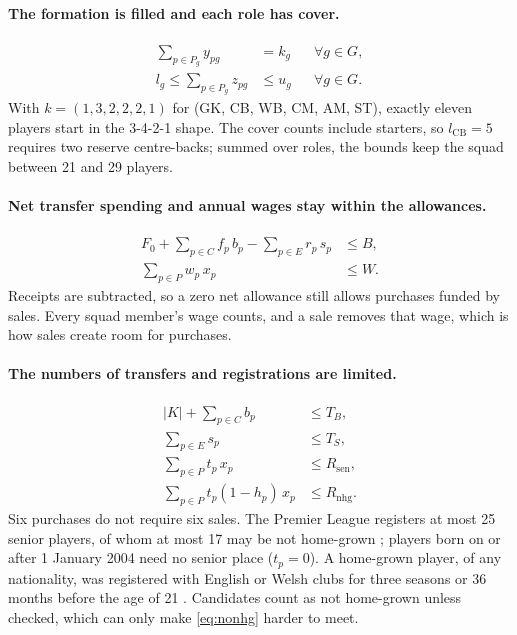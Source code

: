 \paragraph{The formation is filled and each role has cover.}
\begin{align}
\sum_{p \in P_g} y_{pg} &= k_g && \forall g \in G, \label{eq:formation}\\
l_g \le \sum_{p \in P_g} z_{pg} &\le u_g && \forall g \in G. \label{eq:cover}
\end{align}
With $k = (1, 3, 2, 2, 2, 1)$ for (GK, CB, WB, CM, AM, ST), exactly eleven players start in the 3-4-2-1 shape. The cover counts include starters, so $l_{\mathrm{CB}} = 5$ requires two reserve centre-backs; summed over roles, the bounds keep the squad between 21 and 29 players.

\paragraph{Net transfer spending and annual wages stay within the allowances.}
\begin{align}
F_0 + \sum_{p \in C} f_p\, b_p - \sum_{p \in E} r_p\, s_p &\le B, \label{eq:budget}\\
\sum_{p \in P} w_p\, x_p &\le W. \label{eq:wages}
\end{align}
Receipts are subtracted, so a zero net allowance still allows purchases funded by sales. Every squad member's wage counts, and a sale removes that wage, which is how sales create room for purchases.

\paragraph{The numbers of transfers and registrations are limited.}
\begin{align}
|K| + \sum_{p \in C} b_p &\le T_B, \label{eq:arrivals}\\
\sum_{p \in E} s_p &\le T_S, \label{eq:sales}\\
\sum_{p \in P} t_p\, x_p &\le R_{\mathrm{sen}}, \label{eq:senior}\\
\sum_{p \in P} t_p (1 - h_p)\, x_p &\le R_{\mathrm{nhg}}. \label{eq:nonhg}
\end{align}
Six purchases do not require six sales. The Premier League registers at most 25 senior players, of whom at most 17 may be not home-grown \citep{pl2025rules}; players born on or after 1 January 2004 need no senior place ($t_p = 0$). A home-grown player, of any nationality, was registered with English or Welsh clubs for three seasons or 36 months before the age of 21 \citep{pl2025rules}. Candidates count as not home-grown unless checked, which can only make \eqref{eq:nonhg} harder to meet.


